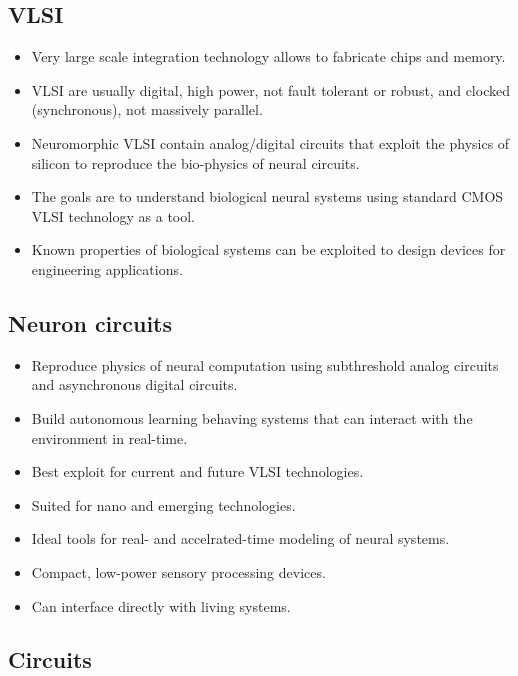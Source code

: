 \documentclass[a4paper, 12pt]{article}
\begin{document}
\subsection{VLSI}
\begin{itemize}[noitemsep,nolistsep]
	\item Very large scale integration technology allows to fabricate chips and memory.
	\item VLSI are usually digital, high power, not fault tolerant or robust, and clocked (synchronous), not massively parallel.
	\item Neuromorphic VLSI contain analog/digital circuits that exploit the physics of silicon to reproduce the bio-physics of neural circuits.
	\item The goals are to understand biological neural systems using standard CMOS VLSI technology as a tool.
	\item Known properties of biological systems can be exploited to design devices for engineering applications.
\end{itemize}

\subsection{Neuron circuits}
\begin{itemize}[noitemsep,nolistsep]
	\item Reproduce physics of neural computation using subthreshold analog circuits and asynchronous digital circuits.
	\item Build autonomous learning behaving systems that can interact with the environment in real-time.
	\item Best exploit for current and future VLSI technologies.
	\item Suited for nano and emerging technologies.
	\item Ideal tools for real- and accelrated-time modeling of neural systems.
	\item Compact, low-power sensory processing devices.
	\item Can interface directly with living systems.
\end{itemize}

\subsection{Circuits}
\end{document}

